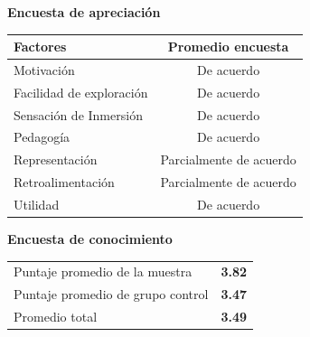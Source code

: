\documentclass[portrait,final,a0paper,fontscale=0.277]{baposter}
\begin{document}
\begin{poster}
{\begin{multicols}{2}
\begin{center}
\begin{tabular}{ll}
\bottomrule
\end{tabular}
\end{center}

\textbf{Encuesta de apreciación}
\begin{center}

\scriptsize 
\begin{tabular}{lc}
\toprule
Factores                 & Promedio encuesta  \\
\midrule
Motivación               & De acuerdo    			\\
Facilidad de exploración & De acuerdo               \\
Sensación de Inmersión   & De acuerdo               \\
Pedagogía                & De acuerdo               \\
Representación           & Parcialmente de acuerdo  \\
Retroalimentación        & Parcialmente de acuerdo  \\
Utilidad                 & De acuerdo               \\
\bottomrule
\end{tabular}

  
 \end{center}

\textbf{Encuesta de conocimiento}
\begin{center}
		\scriptsize 
		\begin{tabular}{lr}
			\toprule
			Puntaje promedio de la muestra    & \textbf{3.82} \\
			Puntaje promedio de grupo control & \textbf{3.47} \\
			\midrule
			Promedio total                    & \textbf{3.49} \\
			\bottomrule
		\end{tabular}
	\end{center}
 

\end{multicols}}
\end{poster}
\end{document}
